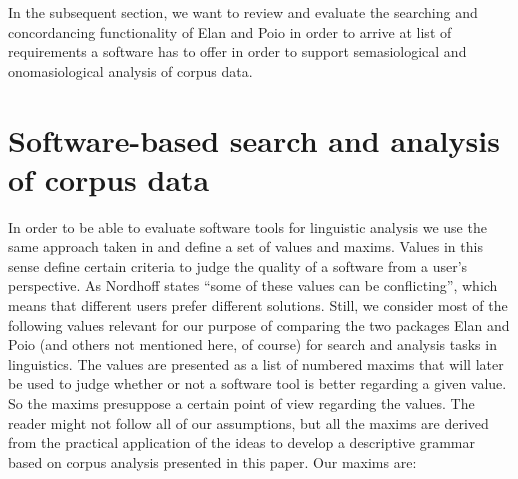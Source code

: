 In the subsequent section, we want to review and evaluate the searching and concordancing functionality of Elan and Poio in order to arrive at list of requirements a software has to offer in order to support semasiological and onomasiological analysis of corpus data.

\section{Software-based search and analysis of corpus data}
\label{bouda:sec:softwarebasesearch}
In order to be able to evaluate software tools for linguistic analysis we use the same approach taken in \citet{Nordhoff2008} and define a set of values and maxims. Values in this sense define certain criteria to judge the quality of a software from a user's perspective. As Nordhoff states ``some of these values can be conflicting'', which means that different users prefer different solutions. Still, we consider most of the following values relevant for our purpose of comparing the two packages Elan and Poio (and others not mentioned here, of course) for search and analysis tasks in linguistics. The values are presented as a list of numbered maxims that will later be used to judge whether or not a software tool is better regarding a given value. So the maxims presuppose a certain point of view regarding the values. The reader might not follow all of our assumptions, but all the maxims are derived from the practical application of the ideas to develop a descriptive grammar based on corpus analysis presented in this paper. Our maxims are:

